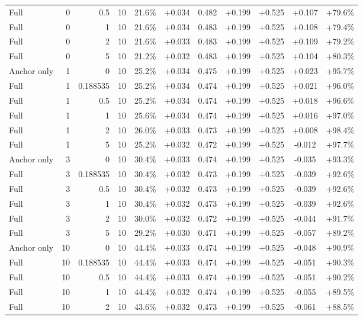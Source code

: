 \begin{table}[htbp]
\begin{tabular}{lrrrccccccc}
Full & 0 & 0.5 & 10 & 21.6\% & +0.034 & 0.482 & +0.199 & +0.525 & +0.107 & +79.6\% \\
Full & 0 & 1 & 10 & 21.6\% & +0.034 & 0.483 & +0.199 & +0.525 & +0.108 & +79.4\% \\
Full & 0 & 2 & 10 & 21.6\% & +0.033 & 0.483 & +0.199 & +0.525 & +0.109 & +79.2\% \\
Full & 0 & 5 & 10 & 21.2\% & +0.032 & 0.483 & +0.199 & +0.525 & +0.104 & +80.3\% \\
Anchor only & 1 & 0 & 10 & 25.2\% & +0.034 & 0.475 & +0.199 & +0.525 & +0.023 & +95.7\% \\
Full & 1 & 0.188535 & 10 & 25.2\% & +0.034 & 0.474 & +0.199 & +0.525 & +0.021 & +96.0\% \\
Full & 1 & 0.5 & 10 & 25.2\% & +0.034 & 0.474 & +0.199 & +0.525 & +0.018 & +96.6\% \\
Full & 1 & 1 & 10 & 25.6\% & +0.034 & 0.474 & +0.199 & +0.525 & +0.016 & +97.0\% \\
Full & 1 & 2 & 10 & 26.0\% & +0.033 & 0.473 & +0.199 & +0.525 & +0.008 & +98.4\% \\
Full & 1 & 5 & 10 & 25.2\% & +0.032 & 0.472 & +0.199 & +0.525 & -0.012 & +97.7\% \\
Anchor only & 3 & 0 & 10 & 30.4\% & +0.033 & 0.474 & +0.199 & +0.525 & -0.035 & +93.3\% \\
Full & 3 & 0.188535 & 10 & 30.4\% & +0.032 & 0.473 & +0.199 & +0.525 & -0.039 & +92.6\% \\
Full & 3 & 0.5 & 10 & 30.4\% & +0.032 & 0.473 & +0.199 & +0.525 & -0.039 & +92.6\% \\
Full & 3 & 1 & 10 & 30.4\% & +0.032 & 0.473 & +0.199 & +0.525 & -0.039 & +92.6\% \\
Full & 3 & 2 & 10 & 30.0\% & +0.032 & 0.472 & +0.199 & +0.525 & -0.044 & +91.7\% \\
Full & 3 & 5 & 10 & 29.2\% & +0.030 & 0.471 & +0.199 & +0.525 & -0.057 & +89.2\% \\
Anchor only & 10 & 0 & 10 & 44.4\% & +0.033 & 0.474 & +0.199 & +0.525 & -0.048 & +90.9\% \\
Full & 10 & 0.188535 & 10 & 44.4\% & +0.033 & 0.474 & +0.199 & +0.525 & -0.051 & +90.3\% \\
Full & 10 & 0.5 & 10 & 44.4\% & +0.033 & 0.474 & +0.199 & +0.525 & -0.051 & +90.2\% \\
Full & 10 & 1 & 10 & 44.4\% & +0.032 & 0.474 & +0.199 & +0.525 & -0.055 & +89.5\% \\
Full & 10 & 2 & 10 & 43.6\% & +0.032 & 0.473 & +0.199 & +0.525 & -0.061 & +88.5\% \\

\end{tabular}
\end{table}

